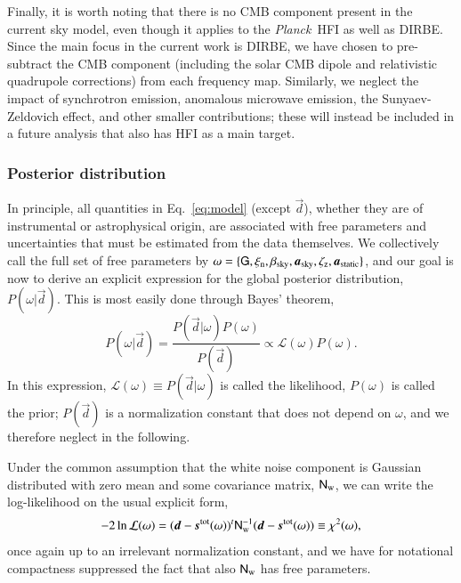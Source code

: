 \documentclass{aa}
\def\Planck{\textit{Planck}}
\newcommand{\dv}[0]{\vec{d}}
\newcommand{\G}[0]{\tens{G}}
\newcommand{\s}[0]{\vec{s}}
\renewcommand{\a}[0]{\vec{a}}
\newcommand{\N}[0]{\tens{N}}
\begin{document}
Finally, it is worth noting that there is no CMB component present in
the current sky model, even though it applies to the \Planck\ HFI as
well as DIRBE. Since the main focus in the current work is DIRBE, we
have chosen to pre-subtract the CMB component (including the solar CMB
dipole and relativistic quadrupole corrections) from each frequency
map. Similarly, we neglect the impact of synchrotron emission,
anomalous microwave emission, the Sunyaev-Zeldovich effect, and other
smaller contributions; these will instead be included in a future
analysis that also has HFI as a main target.

\subsubsection{Posterior distribution}

In principle, all quantities in Eq.~\ref{eq:model} (except $\dv$),
whether they are of instrumental or astrophysical origin, are
associated with free parameters and uncertainties that must be
estimated from the data themselves. We collectively call the full set
of free parameters by $\omega =
\{\G,\xi_{\mathrm{n}},
\beta_{\mathrm{sky}},\a_{\mathrm{sky}},\zeta_{\mathrm{z}},\a_{\mathrm{static}}\}$,
and our goal is now to derive an explicit expression for the global
posterior distribution, $P(\omega|\dv)$. This is most easily done
through Bayes' theorem,
\begin{equation}
P(\omega|\dv) = \frac{P(\dv|\omega) P(\omega)}{P(\dv)} \propto
\mathcal{L}(\omega) P(\omega).
\end{equation}
In this expression, $\mathcal{L}(\omega) \equiv  P(\dv|\omega)$ is
called the likelihood, $P(\omega)$ is called the prior; $P(\dv)$ is a
normalization constant that does not depend on $\omega$, and we
therefore neglect in the following.

Under the common assumption that the white noise component is Gaussian
distributed with zero mean and some covariance matrix,
$\N_{\mathrm{w}}$, we can write the log-likelihood on the usual
explicit form,
\begin{equation}
-2\ln\mathcal{L}(\omega) = (\dv-\s^{\mathrm{tot}}(\omega))^t
  \N_{\mathrm{w}}^{-1}(\dv-\s^{\mathrm{tot}}(\omega)) \equiv \chi^2(\omega),
\end{equation}
once again up to an irrelevant normalization constant, and we have for
notational compactness suppressed the fact that also $\N_{\mathrm{w}}$ has free
parameters. 
\end{document}
